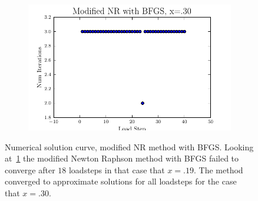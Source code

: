\documentclass[10pt,letterpaper]{article}
\begin{document}
\begin{figure}[!tbh]
\begin{subfigure}[b]{.6\textwidth}
    \caption{}
    \label{fig5:label:c}
  \end{subfigure}
  \hfill
  \begin{subfigure}[b]{.6\textwidth}
    \includegraphics[width=\textwidth]{moded_nr_bfgs_x30_conv.pdf}
    \caption{}
    \label{fig5:label:d}
  \end{subfigure}
    \caption{Numerical solution curve, modified NR method with BFGS. Looking at~\ref{fig5:label:c} the modified Newton Raphson method with BFGS failed to converge after $18$ loadsteps in that case that $x=.19$. The method converged to approximate solutions for all loadsteps for the case that $x=.30$.
 }
\end{figure}
\end{document}
